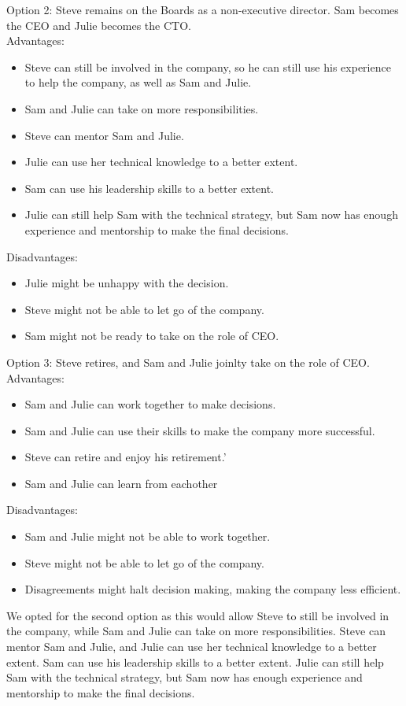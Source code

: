 \documentclass[a4paper,10pt]{article}
\begin{document}
Option 2: Steve remains on the Boards as a non-executive director. Sam becomes the CEO and Julie becomes the CTO.\\

Advantages:\\
\begin{itemize}
    \item Steve can still be involved in the company, so he can still use his experience to help the company, as well as Sam and Julie.
    \item Sam and Julie can take on more responsibilities.
    \item Steve can mentor Sam and Julie.
    \item Julie can use her technical knowledge to a better extent.
    \item Sam can use his leadership skills to a better extent.
    \item Julie can still help Sam with the technical strategy, but Sam now has enough experience and mentorship to make the final decisions.
\end{itemize}

Disadvantages:\\
\begin{itemize}
    \item Julie might be unhappy with the decision.
    \item Steve might not be able to let go of the company.
    \item Sam might not be ready to take on the role of CEO.
\end{itemize}

Option 3: Steve retires, and Sam and Julie joinlty take on the role of CEO.\\

Advantages:\\
\begin{itemize}
    \item Sam and Julie can work together to make decisions.
    \item Sam and Julie can use their skills to make the company more successful.
    \item Steve can retire and enjoy his retirement.'
    \item Sam and Julie can learn from eachother
\end{itemize}

Disadvantages:\\
\begin{itemize}
    \item Sam and Julie might not be able to work together.
    \item Steve might not be able to let go of the company.
    \item Disagreements might halt decision making, making the company less efficient.
\end{itemize}

We opted for the second option as this would allow Steve to still be involved in the company, while Sam and Julie can take on more responsibilities. Steve can mentor Sam and Julie, and Julie can use her technical knowledge to a better extent. Sam can use his leadership skills to a better extent. Julie can still help Sam with the technical strategy, but Sam now has enough experience and mentorship to make the final decisions.
\end{document}
